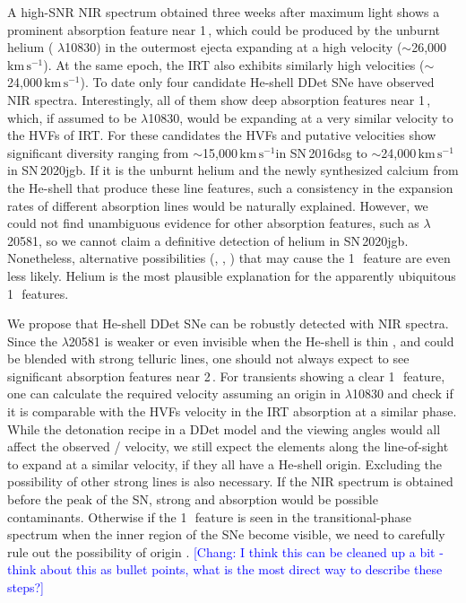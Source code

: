 \documentclass[twocolumn]{aastex631}
\newcommand{\sn}{SN\,2020jgb}
\newcommand{\kms}{$\mathrm{km}\,\mathrm{s}^{-1}$}
\newcommand{\chang}[1]{\textcolor{blue}{[Chang: #1]}}
\begin{document}
A high-SNR NIR spectrum obtained three weeks after maximum light shows a prominent absorption feature near 1\,\micron, which could be produced by the unburnt helium ( $\lambda$10830) in the outermost ejecta expanding at a high velocity ($\sim$26,000\,\kms). At the same epoch, the  IRT also exhibits similarly high velocities ($\sim$24,000\,\kms). To date only four candidate He-shell DDet SNe have observed NIR spectra. Interestingly, all of them show deep absorption features near 1\,\micron, which, if assumed to be  $\lambda$10830, would be expanding at a very similar velocity to the HVFs of  IRT. For these candidates the  HVFs and putative  velocities show significant diversity ranging from $\sim$15,000\,\kms in SN\,2016dsg to $\sim$24,000\,\kms in \sn. If it is the unburnt helium and the newly synthesized calcium from the He-shell that produce these line features, such a consistency in the expansion rates of different absorption lines would be naturally explained. However, we could not find unambiguous evidence for other  absorption features, such as  $\lambda$20581, so we cannot claim a definitive detection of helium in \sn. Nonetheless, alternative possibilities (, , ) that may cause the 1\,\micron\ feature are even less likely. Helium is the most plausible explanation for the apparently ubiquitous 1\,\micron\ features.

We propose that He-shell DDet SNe can be robustly detected with NIR spectra. 
Since the  $\lambda$20581 is weaker or even invisible when the He-shell is thin \citep{Boyle2017_Helium}, and could be blended with strong telluric lines, one should not always expect to see significant absorption features near 2\,\micron. For transients showing a clear 1\,\micron\ feature, one can calculate the required velocity assuming an origin in  $\lambda$10830 and check if it is comparable with the HVFs velocity in the  IRT absorption at a similar phase. While the detonation recipe in a DDet model and the viewing angles would all affect the observed / velocity, we still expect the elements along the line-of-sight to expand at a similar velocity, if they all have a He-shell origin. Excluding the possibility of other strong lines is also necessary. If the NIR spectrum is obtained before the peak of the SN, strong  and  absorption \citep{Hsiao_CSP_2019} would be possible contaminants. Otherwise if the 1\,\micron\ feature is seen in the transitional-phase spectrum when the inner region of the SNe become visible, we need to carefully rule out the possibility of  origin \citep{Marion2009_NIR}. \chang{I think this can be cleaned up a bit - think about this as bullet points, what is the most direct way to describe these steps?}
\end{document}
